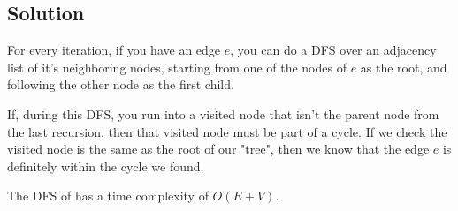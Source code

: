 \subsection*{Solution}

For every iteration, if you have an edge $e$, you can do a DFS over an adjacency list of it's neighboring nodes, starting from one of the nodes of $e$ as the root, and following the other node as the first child.

If, during this DFS, you run into a visited node that isn't the parent node from the last recursion, then that visited node must be part of a cycle. If we check the visited node is the same as the root of our "tree", then we know that the edge $e$ is definitely within the cycle we found.

The DFS of has a time complexity of $O(E+V)$.
